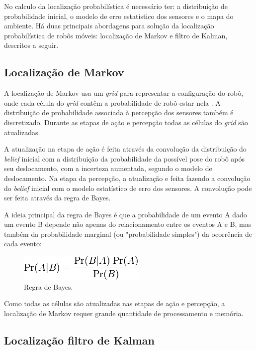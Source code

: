  No calculo da localização probabilística é necessário ter: a distribuição de probabilidade inicial, 
 o modelo de erro estatístico dos sensores e o mapa do ambiente.
 Há duas principais abordagens para solução da localização probabilística de robôs móveis: 
 localização de Markov e filtro de Kalman, descritos a seguir.  
 
 \subsection{Localização de Markov}
	A localização de Markov usa um \textit{grid} para representar a configuração do robô, onde cada célula do \textit{grid}
	contêm a probabilidade de robô estar nela \cite{localization1}. A distribuição de probabilidade associada à percepção 
	dos sensores também é discretizado. Durante as etapas de ação e percepção todas as células do \textit{grid} são atualizadas. 
	
	A atualização na etapa de ação é feita através da convolução da distribuição do \textit{belief} inicial com a distribuição
	da probabilidade da possível pose do robô após seu deslocamento, com a incerteza aumentada, segundo o modelo de deslocamento.
	Na etapa da percepção, a atualização e feita fazendo a convolução do \textit{belief} inicial com o modelo estatístico de erro
	dos sensores. A convolução pode ser feita através da regra de Bayes\cite{localization1}.
	
	A ideia principal da regra de Bayes é que a probabilidade de um evento A dado um evento B 
	depende não apenas do relacionamento entre os eventos A e B, 
	mas também da probabilidade marginal (ou "probabilidade simples") da ocorrência de cada evento:
	
	\begin{figure}[hb]
	\centering
	\includegraphics[scale=0.7]{images/bayes.png}
	\caption{Regra de Bayes.}
	\label{fig:topologia}
	\end{figure}
	
	Como todas as células são atualizadas nas etapas de ação e percepção, a localização de Markov requer grande 
	quantidade de processamento e memória.
 
 \subsection{Localização filtro de Kalman}
 
